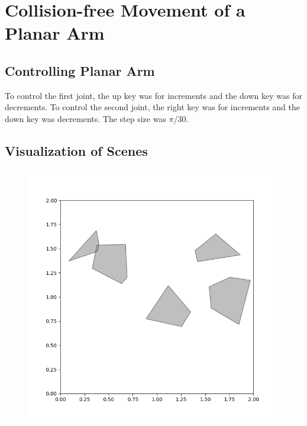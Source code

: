 \documentclass{article}
\begin{document}
 
\section{Collision-free Movement of a Planar Arm}
\subsection{Controlling Planar Arm}
To control the first joint, the up key was for increments and the down key was for decrements. To control the second joint, the right key was for increments and the down key was decrements. The step size was $\pi$/30.
\subsection{Visualization of Scenes}

\begin{figure}[H]
  \centering
  \begin{minipage}{0.45\textwidth}
    \includegraphics[scale = 0.3]{part4_visualization.png}
  \end{minipage}\hfill
  \begin{minipage}{0.45\textwidth}

\end{minipage}
\end{figure}
\end{document}
